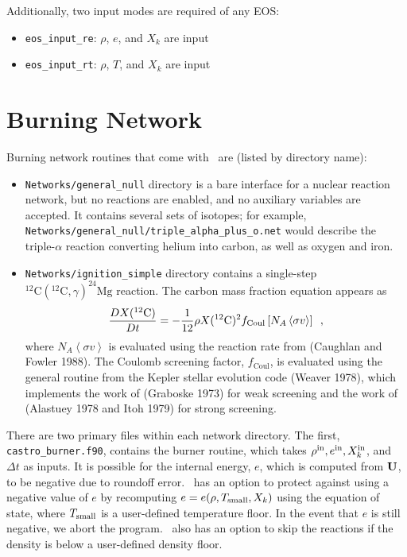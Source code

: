 Additionally, two input modes are required of any EOS:
\begin{itemize}
\item {\tt eos\_input\_re}: $\rho$, $e$, and $X_k$ are input
\item {\tt eos\_input\_rt}: $\rho$, $T$, and $X_k$ are input
\end{itemize}



\section{Burning Network}
Burning network routines that come with \castro\ are (listed by directory name):
\begin{itemize}
\item {\tt Networks/general\_null} directory is a bare interface for a
  nuclear reaction network, but no reactions are enabled, and no
  auxiliary variables are accepted. It contains several sets of
  isotopes; for example,
  {\tt Networks/general\_null/triple\_alpha\_plus\_o.net} would describe the
  triple-$\alpha$ reaction converting helium into carbon, as well as
  oxygen and iron.
\item {\tt Networks/ignition\_simple} directory contains a single-step
  $^{12}\mathrm{C}(^{12}\mathrm{C},\gamma)^{24}\mathrm{Mg}$ reaction.
  The carbon mass fraction equation appears as
\begin{equation}
\frac{D X(^{12}\mathrm{C})}{Dt} = - \frac{1}{12} \rho X(^{12}\mathrm{C})^2
    f_\mathrm{Coul} \left [N_A \left <\sigma v \right > \right]\enskip,
\end{equation}
where $N_A \left <\sigma v\right>$ is evaluated using the reaction
rate from (Caughlan and Fowler 1988).  The Coulomb screening factor,
$f_\mathrm{Coul}$, is evaluated using the general routine from the
Kepler stellar evolution code (Weaver 1978), which implements the work
of (Graboske 1973) for weak screening and the work of (Alastuey 1978
and Itoh 1979) for strong screening.
\end{itemize}

There are two primary files within each network directory. The first,
{\tt castro\_burner.f90}, contains the burner routine, which takes
$\rho^{\rm in}, e^{\rm in}, X_k^{\rm in}$, and $\Delta t$ as inputs.  It is
possible for the internal energy, $e$, which is computed from ${\bf U}$,
to be negative due to roundoff error.  \castro\ has an option to protect
against using a negative value of $e$ by recomputing $e =
e(\rho,T_{\rm small},X_k)$ using the equation of state, where $T_{\rm
  small}$ is a user-defined temperature floor.  In the event that $e$
is still negative, we abort the program.  \castro\ also has an option to
skip the reactions if the density is below a user-defined density
floor.

